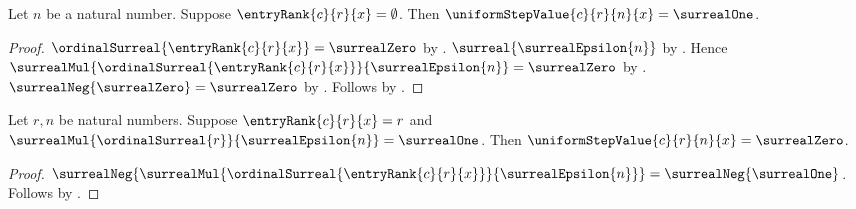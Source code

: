 \begin{proposition}\label{uniform_step_value_at_zero_rank}
    Let $n$ be a natural number.
    Suppose $\entryRank{c}{r}{x}=\emptyset$.
    Then $\uniformStepValue{c}{r}{n}{x}=\surrealOne$.
\end{proposition}
\begin{proof}
    $\ordinalSurreal{\entryRank{c}{r}{x}}=\surrealZero$
        by .
    $\surreal{\surrealEpsilon{n}}$
        by .
    Hence
        $\surrealMul{\ordinalSurreal{\entryRank{c}{r}{x}}}
            {\surrealEpsilon{n}}=\surrealZero$
        by .
    $\surrealNeg{\surrealZero}=\surrealZero$
        by .
    Follows by
        .
\end{proof}

\begin{proposition}\label{uniform_step_value_at_sentinel}
    Let $r,n$ be natural numbers.
    Suppose $\entryRank{c}{r}{x}=r$ and
        $\surrealMul{\ordinalSurreal{r}}{\surrealEpsilon{n}}
            =\surrealOne$.
    Then $\uniformStepValue{c}{r}{n}{x}=\surrealZero$.
\end{proposition}
\begin{proof}
    $\surrealNeg{
        \surrealMul{\ordinalSurreal{\entryRank{c}{r}{x}}}
            {\surrealEpsilon{n}}}
        =\surrealNeg{\surrealOne}$.
    Follows by
        .
\end{proof}

